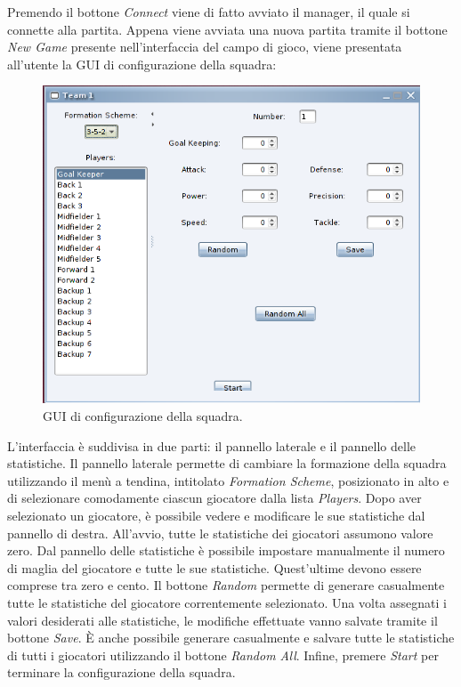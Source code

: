 Premendo il bottone \emph{Connect} viene di fatto avviato il manager, il quale si connette alla partita. Appena viene avviata una nuova partita tramite il bottone \emph{New Game} presente nell'interfaccia del campo di gioco, viene presentata all'utente la GUI di configurazione della squadra:
\begin{figure}[h]
	\centering
	\includegraphics[scale=.5]{images/team_configuration}
	\caption{GUI di configurazione della squadra.}
\end{figure}

L'interfaccia è suddivisa in due parti: il pannello laterale e il pannello delle statistiche. Il pannello laterale permette di cambiare la formazione della squadra utilizzando il menù a tendina, intitolato \emph{Formation Scheme}, posizionato in alto e di selezionare comodamente ciascun giocatore dalla lista \emph{Players}. Dopo aver selezionato un giocatore, è possibile vedere e modificare le sue statistiche dal pannello di destra. All'avvio, tutte le statistiche dei giocatori assumono valore zero. Dal pannello delle statistiche è possibile impostare manualmente il numero di maglia del giocatore e tutte le sue statistiche. Quest'ultime devono essere comprese tra zero e cento. Il bottone \emph{Random} permette di generare casualmente tutte le statistiche del giocatore correntemente selezionato. Una volta assegnati i valori desiderati alle statistiche, le modifiche effettuate vanno salvate tramite il bottone \emph{Save}. \`{E} anche possibile generare casualmente e salvare tutte le statistiche di tutti i giocatori utilizzando il bottone \emph{Random All}. Infine, premere \emph{Start} per terminare la configurazione della squadra.\\

